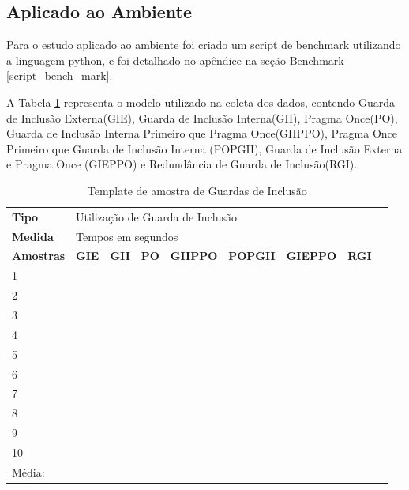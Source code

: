 \subsection{Aplicado ao Ambiente}\label{Amplicação ao Ambiente}

Para o estudo aplicado ao ambiente foi criado um script de benchmark utilizando
 a linguagem python, e foi detalhado no apêndice na seção Benchmark \ref{script_bench_mark}.

A Tabela \ref{tab:modelo_guards} representa o modelo utilizado na coleta dos dados,
 contendo Guarda de Inclusão Externa(GIE), Guarda de Inclusão Interna(GII),
 Pragma Once(PO), Guarda de Inclusão Interna Primeiro que Pragma Once(GIIPPO),
 Pragma Once Primeiro que Guarda de Inclusão Interna (POPGII),
 Guarda de Inclusão Externa e Pragma Once (GIEPPO) e
 Redundância de Guarda de Inclusão(RGI).

\begin{table}[!ht]
\centering
\caption{Template de amostra de Guardas de Inclusão}
\label{tab:modelo_guards}
\begin{tiny}
\begin{tabular}{lp{1cm}p{1cm}p{1cm}p{1cm}p{1cm}p{1cm}p{1cm}p{1cm}}

\textbf{Tipo} & \multicolumn{7}{l}{Utilização de Guarda de Inclusão} \\
\textbf{Medida} & \multicolumn{7}{l}{Tempos em segundos } \\
\textbf{Amostras} & \textbf{GIE} & \textbf{GII} & \textbf{PO} & 
\textbf{GIIPPO} & \textbf{POPGII} & \textbf{GIEPPO} & \textbf{RGI} \\ \toprule
 1  &  &  &   &   &   &   &  \\ 
 2  &  &  &   &   &   &   &  \\ 
 3  &  &  &   &   &   &   &  \\ 
 4  &  &  &   &   &   &   &  \\ 
 5  &  &  &   &   &   &   &  \\ 
 6  &  &  &   &   &   &   &  \\ 
 7  &  &  &   &   &   &   &  \\ 
 8  &  &  &   &   &   &   &  \\ 
 9  &  &  &   &   &   &   &  \\ 
 10 &  &  &   &   &   &   &  \\ \bottomrule
 Média: & & & & &   &   &    \\ 
\end{tabular}
\end{tiny}
\end{table}


